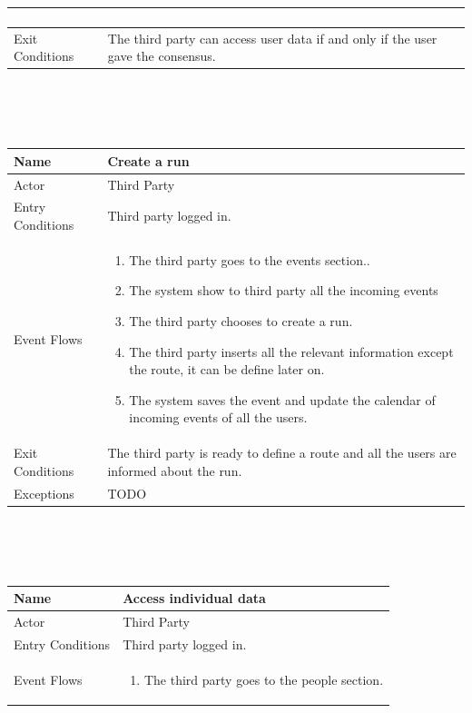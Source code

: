 \documentclass{article}
\begin{document}
\begin{legal}
\begin{legal}
\begin{legal}
\begin{tabular}{| m{3.5cm} | m{8cm}| }
\begin{enumerate}
				\end{enumerate}\\
				\hline
					Exit Conditions & The third party can access user data if and only if the user gave the consensus.\\
				\hline
				\end{tabular}
				\\\\\\
				\begin{tabular}{| m{3.5cm} | m{8cm}| }
				\hline
					Name & Create a run\\
				\hline
					Actor & Third Party\\
				\hline
					Entry Conditions & Third party logged in.\\
				\hline
					Event Flows & \begin{enumerate}
									\item The third party goes to the events section..
									\item The system show to third party all the incoming events
									\item The third party chooses to create a run.
									\item The third party inserts all the relevant information except the route, it can be define later on.
									\item The system saves the event and update the calendar of incoming events of all the users.
				\end{enumerate}\\
				\hline
					Exit Conditions & The third party is ready to define a route and all the users are informed about the run.\\
				\hline %
					Exceptions & TODO %
					\\
				\hline
				\end{tabular}
				\\\\\\
				\begin{tabular}{| m{3.5cm} | m{8cm}| }
				\hline
					Name & Access individual data\\
				\hline
					Actor & Third Party\\
				\hline
					Entry Conditions & Third party logged in.\\
				\hline
					Event Flows & \begin{enumerate}
									\item The third party goes to the people section.

\end{enumerate}
\end{tabular}
\end{legal}
\end{legal}
\end{legal}
\end{document}
